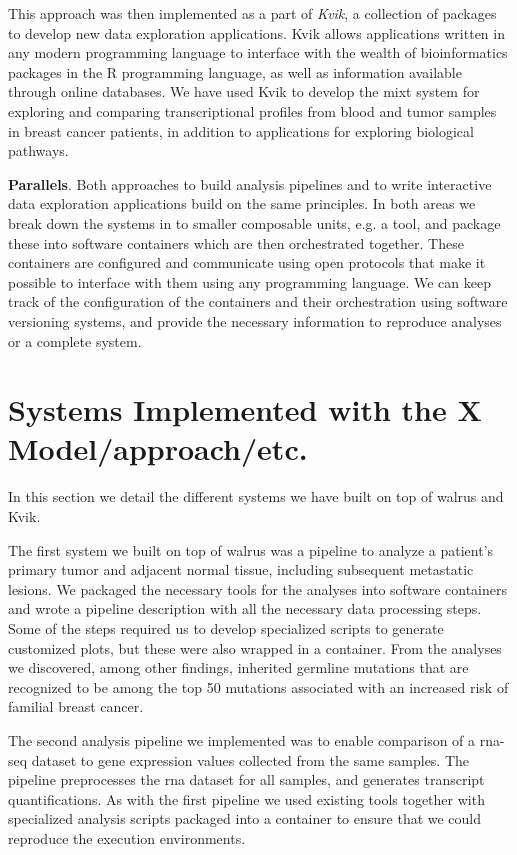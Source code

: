 This approach was then implemented as a part of \emph{Kvik}, a collection of
packages to develop new data exploration applications. Kvik allows
applications written in any modern programming language to interface with the
wealth of bioinformatics packages in the R programming language, as well as
information available through online databases. We have used Kvik to develop the
\gls{mixt} system for exploring and comparing transcriptional profiles from
blood and tumor samples in breast cancer patients, in addition to applications
for exploring biological pathways. 

\textbf{Parallels}. 
Both approaches to build analysis pipelines and to write interactive data
exploration applications build on the same principles. In both areas we break
down the systems in to smaller composable units, e.g. a tool, and package these
into software containers which are then orchestrated together. These containers
are configured and communicate using open protocols that make it possible to
interface with them using any programming language. We can keep track of the
configuration of the containers and their orchestration using software
versioning systems, and provide the necessary information to reproduce analyses
or a complete system. 


\section{Systems Implemented with the X Model/approach/etc.} 
In this section we detail the different systems we have built on top of walrus
and Kvik. 

The first system we built on top of walrus was a pipeline to analyze a patient’s
primary tumor and adjacent normal tissue, including subsequent metastatic
lesions.\cite{walrus} We packaged the necessary tools for the analyses into
software containers and wrote a pipeline description with all the necessary data
processing steps. Some of the steps required us to develop specialized scripts
to generate customized plots, but these were also wrapped in a container. From
the analyses we discovered, among other findings, inherited germline mutations
that are recognized to be among the top 50 mutations associated with an
increased risk of familial breast cancer.

The second analysis pipeline we implemented was to enable comparison of a
\gls{rna}-seq dataset to gene expression values collected from the same samples.
The pipeline preprocesses the \gls{rna} dataset for all samples, and generates
transcript quantifications. As with the first pipeline we used existing tools
together with specialized analysis scripts packaged into a container to ensure
that we could reproduce the execution environments. 


